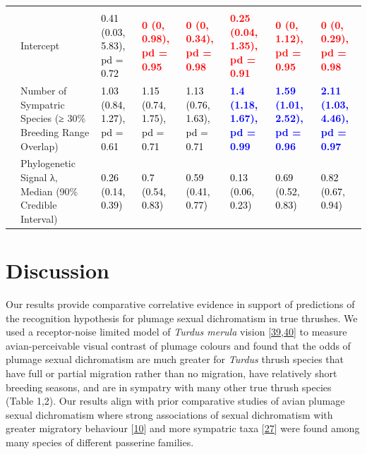 \documentclass[
  a4paper,
]{article}
\begin{document}
\begin{landscape}
\begin{table}
{\begin{tabular}[t]{llllllll}
\addlinespace[0.3em]
\multicolumn{1}{l}{\textbf{Breeding Sympatry}}\\
\hspace{1em} & Intercept & \textcolor{black}{0.41 (0.03, 5.83), pd = 0.72} & \textcolor{red}{\textbf{0 (0, 0.98), pd = 0.95}} & \textcolor{red}{\textbf{0 (0, 0.34), pd = 0.98}} & \textcolor{red}{\textbf{0.25 (0.04, 1.35), pd = 0.91}} & \textcolor{red}{\textbf{0 (0, 1.12), pd = 0.95}} & \textcolor{red}{\textbf{0 (0, 0.29), pd = 0.98}}\\
 & Number of Sympatric Species 
\hspace{1em} (≥ 30\% Breeding Range Overlap) & \textcolor{black}{1.03 (0.84, 1.27), pd = 0.61} & \textcolor{black}{1.15 (0.74, 1.75), pd = 0.71} & \textcolor{black}{1.13 (0.76, 1.63), pd = 0.71} & \textcolor{blue}{\textbf{1.4 (1.18, 1.67), pd = 0.99}} & \textcolor{blue}{\textbf{1.59 (1.01, 2.52), pd = 0.96}} & \textcolor{blue}{\textbf{2.11 (1.03, 4.46), pd = 0.97}}\\
\hspace{1em} & Phylogenetic Signal λ, Median (90\% Credible Interval) & \textcolor{black}{0.26 (0.14, 0.39)} & \textcolor{black}{0.7 (0.54, 0.83)} & \textcolor{black}{0.59 (0.41, 0.77)} & \textcolor{black}{0.13 (0.06, 0.23)} & \textcolor{black}{0.69 (0.52, 0.83)} & \textcolor{black}{0.82 (0.67, 0.94)}\\
\bottomrule
\end{tabular}}
\end{table}
\end{landscape}

\hypertarget{discussion}{%
\section{Discussion}\label{discussion}}

Our results provide comparative correlative evidence in support of
predictions of the recognition hypothesis for plumage sexual
dichromatism in true thrushes. We used a receptor-noise limited model of
\emph{Turdus merula} vision
{[}\protect\hyperlink{ref-vorobyev1998}{39},\protect\hyperlink{ref-hart2000}{40}{]}
to measure avian-perceivable visual contrast of plumage colours and
found that the odds of plumage sexual dichromatism are much greater for
\emph{Turdus} thrush species that have full or partial migration rather
than no migration, have relatively short breeding seasons, and are in
sympatry with many other true thrush species (Table 1,2). Our results
align with prior comparative studies of avian plumage sexual
dichromatism where strong associations of sexual dichromatism with
greater migratory behaviour {[}\protect\hyperlink{ref-dale2015}{10}{]}
and more sympatric taxa {[}\protect\hyperlink{ref-cooney2017}{27}{]}
were found among many species of different passerine families.
\end{document}
